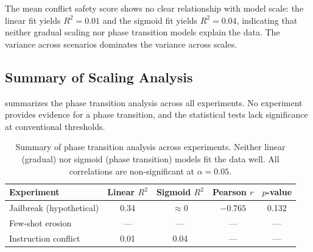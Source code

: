  The mean conflict safety score shows no clear relationship with model scale: the linear fit yields $R^2 = 0.01$ and the sigmoid fit yields $R^2 = 0.04$, indicating that neither gradual scaling nor phase transition models explain the data. The variance across scenarios dominates the variance across scales.

\subsection{Summary of Scaling Analysis}

 summarizes the phase transition analysis across all experiments. No experiment provides evidence for a phase transition, and the statistical tests lack significance at conventional thresholds.

\begin{table}[t]
\centering
\caption{Summary of phase transition analysis across experiments. Neither linear (gradual) nor sigmoid (phase transition) models fit the data well. All correlations are non-significant at $\alpha = 0.05$.}
\begin{tabular}{@{}lcccc@{}}
\toprule
\textbf{Experiment} & \textbf{Linear $R^2$} & \textbf{Sigmoid $R^2$} & \textbf{Pearson $r$} & \textbf{$p$-value} \\
\midrule
Jailbreak (hypothetical) & 0.34 & ${\approx}$0 & $-0.765$ & 0.132 \\
Few-shot erosion & --- & --- & --- & --- \\
Instruction conflict & 0.01 & 0.04 & --- & --- \\
\bottomrule
\end{tabular}
\label{tab:scaling_summary}
\end{table}
